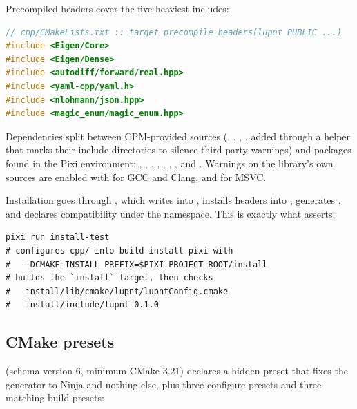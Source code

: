 Precompiled headers cover the five heaviest includes:

\begin{lstlisting}[language=cpp]
// cpp/CMakeLists.txt :: target_precompile_headers(lupnt PUBLIC ...)
#include <Eigen/Core>
#include <Eigen/Dense>
#include <autodiff/forward/real.hpp>
#include <yaml-cpp/yaml.h>
#include <nlohmann/json.hpp>
#include <magic_enum/magic_enum.hpp>
\end{lstlisting}

Dependencies split between CPM-provided sources (,
, , , added through a
 helper that marks their include
directories  to silence third-party warnings) and packages found
in the Pixi environment: , , ,
, , , , and .
Warnings on the library's own sources are enabled with
 for GCC and Clang, and
 for MSVC.

Installation goes through , which writes
 into , installs headers into
, generates , and declares
 compatibility under the  namespace. This
is exactly what  asserts:

\begin{lstlisting}[language=shell]
pixi run install-test
# configures cpp/ into build-install-pixi with
#   -DCMAKE_INSTALL_PREFIX=$PIXI_PROJECT_ROOT/install
# builds the `install` target, then checks
#   install/lib/cmake/lupnt/lupntConfig.cmake
#   install/include/lupnt-0.1.0
\end{lstlisting}

\subsection{CMake presets}
\label{sec:dev-presets}

 (schema version 6, minimum CMake 3.21) declares a
hidden  preset that fixes the generator to Ninja and nothing
else, plus three configure presets and three matching build presets:

